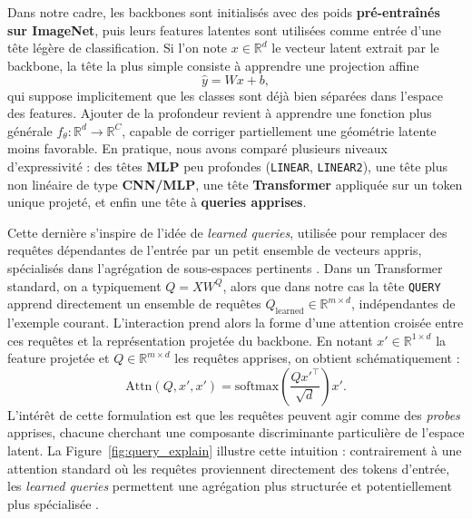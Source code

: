 \documentclass[journal,twocolumn]{IEEEtran}
\begin{document}
Dans notre cadre, les backbones sont initialisés avec des poids \textbf{pré-entraînés sur ImageNet}, puis leurs features latentes sont utilisées comme entrée d’une tête légère de classification. Si l’on note $x \in \mathbb{R}^{d}$ le vecteur latent extrait par le backbone, la tête la plus simple consiste à apprendre une projection affine
\begin{equation}
\hat{y} = W x + b,
\end{equation}
qui suppose implicitement que les classes sont déjà bien séparées dans l’espace des features. Ajouter de la profondeur revient à apprendre une fonction plus générale $f_\theta : \mathbb{R}^{d} \rightarrow \mathbb{R}^{C}$, capable de corriger partiellement une géométrie latente moins favorable. En pratique, nous avons comparé plusieurs niveaux d’expressivité : des têtes \textbf{MLP} peu profondes (\texttt{LINEAR}, \texttt{LINEAR2}), une tête plus non linéaire de type \textbf{CNN/MLP}, une tête \textbf{Transformer} appliquée sur un token unique projeté, et enfin une tête à \textbf{queries apprises}.

Cette dernière s’inspire de l’idée de \textit{learned queries}, utilisée pour remplacer des requêtes dépendantes de l’entrée par un petit ensemble de vecteurs appris, spécialisés dans l’agrégation de sous-espaces pertinents \cite{arar2022learnedqueriesefficientlocal}. Dans un Transformer standard, on a typiquement $Q = XW^Q$, alors que dans notre cas la tête \texttt{QUERY} apprend directement un ensemble de requêtes $Q_{\mathrm{learned}} \in \mathbb{R}^{m \times d}$, indépendantes de l’exemple courant. L’interaction prend alors la forme d’une attention croisée entre ces requêtes et la représentation projetée du backbone. En notant $x' \in \mathbb{R}^{1 \times d}$ la feature projetée et $Q \in \mathbb{R}^{m \times d}$ les requêtes apprises, on obtient schématiquement :
\begin{equation}
\mathrm{Attn}(Q, x', x') = \mathrm{softmax}\left(\frac{Q {x'}^{\top}}{\sqrt{d}}\right)x'.
\end{equation}
L’intérêt de cette formulation est que les requêtes peuvent agir comme des \textit{probes} apprises, chacune cherchant une composante discriminante particulière de l’espace latent. La Figure~\ref{fig:query_explain} illustre cette intuition : contrairement à une attention standard où les requêtes proviennent directement des tokens d’entrée, les \textit{learned queries} permettent une agrégation plus structurée et potentiellement plus spécialisée \cite{arar2022learnedqueriesefficientlocal}.
\end{document}
